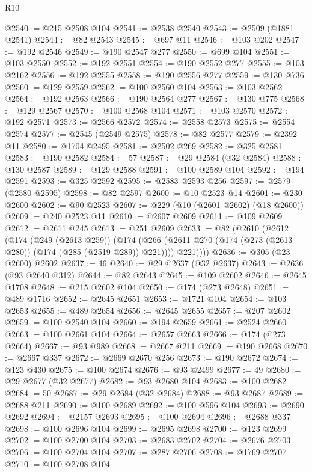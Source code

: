 \begin{lexlean}{R10}
\begin{coremodule}
@2540 := @215 @2508 @104
@2541 := @2538 @2540
@2543 := @2509 (@1881 @2541)
@2544 := @82 @2543
@2545 := @697 @11
@2546 := @103 @202
@2547 := @192 @2546
@2549 := @190 @2547 @277
@2550 := @699 @104
@2551 := @103 @2550
@2552 := @192 @2551
@2554 := @190 @2552 @277
@2555 := @103 @2162
@2556 := @192 @2555
@2558 := @190 @2556 @277
@2559 := @130 @736
@2560 := @129 @2559
@2562 := @100 @2560 @104
@2563 := @103 @2562
@2564 := @192 @2563
@2566 := @190 @2564 @277
@2567 := @130 @775
@2568 := @129 @2567
@2570 := @100 @2568 @104
@2571 := @103 @2570
@2572 := @192 @2571
@2573 := @2566 @2572
@2574 := @2558 @2573
@2575 := @2554 @2574
@2577 := @2545 (@2549 @2575)
@2578 := @82 @2577
@2579 := @2392 @11
@2580 := @1704 @2495
@2581 := @2502 @269
@2582 := @325 @2581
@2583 := @190 @2582
@2584 := 57
@2587 := @29 @2584 (@32 @2584)
@2588 := @130 @2587
@2589 := @129 @2588
@2591 := @100 @2589 @104
@2592 := @194 @2591
@2593 := @325 @2592
@2595 := @2583 @2593 @256
@2597 := @2579 (@2580 @2595)
@2598 := @82 @2597
@2600 := @10 @2523 @14
@2601 := @230 @2600
@2602 := @90 @2523
@2607 := @229 (@10 (@2601 @2602) (@18 @2600))
@2609 := @240 @2523 @11
@2610 := @2607 @2609
@2611 := @109 @2609
@2612 := @2611 @245
@2613 := @251 @2609
@2633 := @82
    (@2610
      (@2612
        (@174
          (@249 (@2613 @259))
          (@174
            (@266 (@2611 @270 (@174 (@273 (@2613 @280)) (@174 (@285 (@2519 @289)) @221))))
            @221))))
@2636 := @305 (@23 @2600) @2602
@2637 := 46
@2640 := @29 @2637 (@32 @2637)
@2643 := @2636 (@93 @2640 @312)
@2644 := @82 @2643
@2645 := @109 @2602
@2646 := @2645 @1708
@2648 := @215 @2602 @104
@2650 := @174 (@273 @2648)
@2651 := @489 @1716
@2652 := @2645 @2651
@2653 := @1721 @104
@2654 := @103 @2653
@2655 := @489 @2654
@2656 := @2645 @2655
@2657 := @207 @2602
@2659 := @100 @2540 @104
@2660 := @194 @2659
@2661 := @2524 @2660
@2663 := @100 @2661 @104
@2664 := @2657 @2663
@2666 := @174 (@273 @2664)
@2667 := @93 @989
@2668 := @2667 @211
@2669 := @190 @2668
@2670 := @2667 @337
@2672 := @2669 @2670 @256
@2673 := @190 @2672
@2674 := @123 @430
@2675 := @100 @2674
@2676 := @93 @2499
@2677 := 49
@2680 := @29 @2677 (@32 @2677)
@2682 := @93 @2680 @104
@2683 := @100 @2682
@2684 := 50
@2687 := @29 @2684 (@32 @2684)
@2688 := @93 @2687
@2689 := @2688 @211
@2690 := @100 @2689
@2692 := @100 @596 @104
@2693 := @2690 @2692
@2694 := @2157 @2693
@2695 := @100 @2694
@2696 := @2688 @337
@2698 := @100 @2696 @104
@2699 := @2695 @2698
@2700 := @123 @2699
@2702 := @100 @2700 @104
@2703 := @2683 @2702
@2704 := @2676 @2703
@2706 := @100 @2704 @104
@2707 := @287 @2706
@2708 := @1769 @2707
@2710 := @100 @2708 @104

\end{coremodule}
\end{lexlean}
